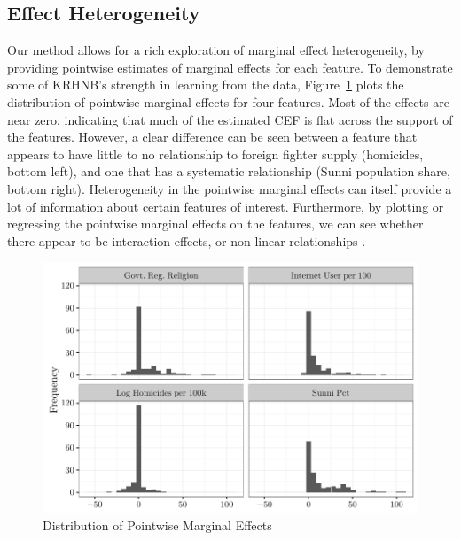 \documentclass[12pt]{article}
\begin{document}
\subsection{Effect Heterogeneity}

Our method allows for a rich exploration of marginal effect heterogeneity, by providing pointwise estimates of marginal effects for each feature. To demonstrate some of KRHNB's strength in learning from the data, Figure~\ref{fig:histeffects} plots the distribution of pointwise marginal effects for four features. Most of the effects are near zero, indicating that much of the estimated CEF is flat across the support of the features. However, a clear difference can be seen between a feature that appears to have little to no relationship to foreign fighter supply (homicides, bottom left), and one that has a systematic relationship (Sunni population share, bottom right). Heterogeneity in the pointwise marginal effects can itself provide a lot of information about certain features of interest. Furthermore, by plotting or regressing the pointwise marginal effects on the features, we can see whether there appear to be interaction effects, or non-linear relationships \citep{Hainmueller2013}. \\

\begin{figure}[!h]
	\centering
	\includegraphics[scale=.85]{tabs_figs/histeffects.pdf}
	\caption{Distribution of Pointwise Marginal Effects}	\label{fig:histeffects} 
\end{figure}
\end{document}
